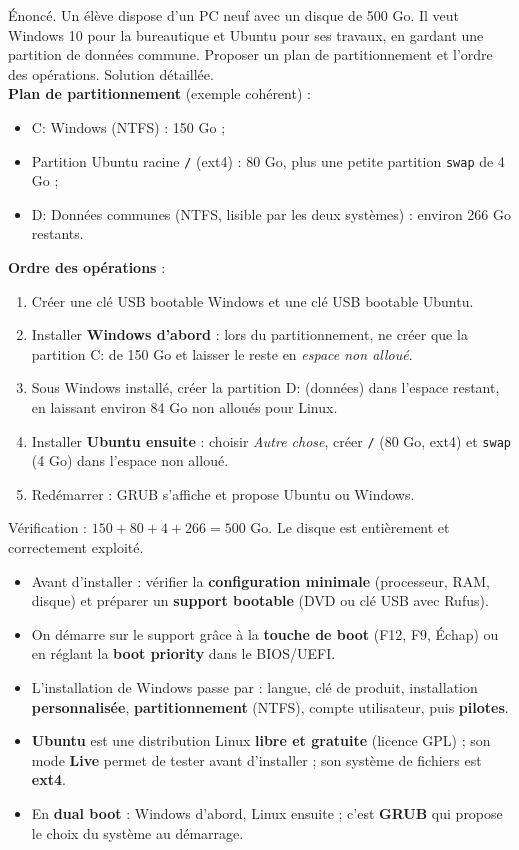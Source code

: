 \documentclass[11pt]{article}
\begin{document}
\begin{exoresolu}
Énoncé. Un élève dispose d'un PC neuf avec un disque de 500 Go. Il veut Windows 10 pour la bureautique et Ubuntu pour ses travaux, en gardant une partition de données commune. Proposer un plan de partitionnement et l'ordre des opérations.
\tcblower
Solution détaillée.\\
\textbf{Plan de partitionnement} (exemple cohérent) :
\begin{itemize}
\item C: Windows (NTFS) : 150 Go ;
\item Partition Ubuntu racine \texttt{/} (ext4) : 80 Go, plus une petite partition \texttt{swap} de 4 Go ;
\item D: Données communes (NTFS, lisible par les deux systèmes) : environ 266 Go restants.
\end{itemize}
\textbf{Ordre des opérations} :
\begin{enumerate}
\item Créer une clé USB bootable Windows et une clé USB bootable Ubuntu.
\item Installer \textbf{Windows d'abord} : lors du partitionnement, ne créer que la partition C: de 150 Go et laisser le reste en \emph{espace non alloué}.
\item Sous Windows installé, créer la partition D: (données) dans l'espace restant, en laissant environ 84 Go non alloués pour Linux.
\item Installer \textbf{Ubuntu ensuite} : choisir \emph{Autre chose}, créer \texttt{/} (80 Go, ext4) et \texttt{swap} (4 Go) dans l'espace non alloué.
\item Redémarrer : GRUB s'affiche et propose Ubuntu ou Windows.
\end{enumerate}
Vérification : $150 + 80 + 4 + 266 = 500$ Go. Le disque est entièrement et correctement exploité.
\end{exoresolu}

\begin{aretenir}
\begin{itemize}
\item Avant d'installer : vérifier la \textbf{configuration minimale} (processeur, RAM, disque) et préparer un \textbf{support bootable} (DVD ou clé USB avec Rufus).
\item On démarre sur le support grâce à la \textbf{touche de boot} (F12, F9, Échap) ou en réglant la \textbf{boot priority} dans le BIOS/UEFI.
\item L'installation de Windows passe par : langue, clé de produit, installation \textbf{personnalisée}, \textbf{partitionnement} (NTFS), compte utilisateur, puis \textbf{pilotes}.
\item \textbf{Ubuntu} est une distribution Linux \textbf{libre et gratuite} (licence GPL) ; son mode \textbf{Live} permet de tester avant d'installer ; son système de fichiers est \textbf{ext4}.
\item En \textbf{dual boot} : Windows d'abord, Linux ensuite ; c'est \textbf{GRUB} qui propose le choix du système au démarrage.
\end{itemize}
\end{aretenir}
\end{document}
